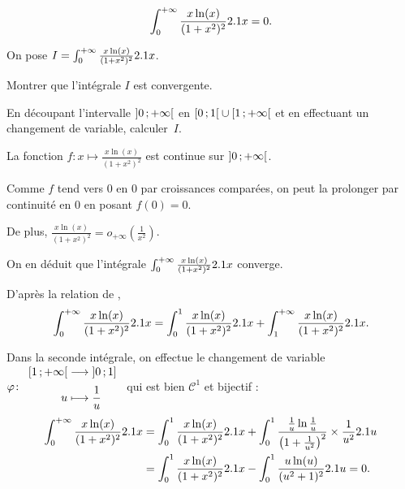 \begin{prop}
\[
\int_0^{+\infty} \frac{x \ln(x)}{(1 + x^2)^2} 2.1 x
= 0.
\]
\end{prop}

\begin{exercice}
On pose $I = \int_0^{+\infty} \frac{x \ln(x)}{(1 + x^2)^2} 2.1 x$.
\begin{questions}
\item Montrer que l'intégrale $I$ est convergente.

\item En découpant l'intervalle $\left]0\,;+\infty\right[$ en $\left[0\,;1\right[ \cup \left[1\,;+\infty\right[$ et en effectuant un changement de variable, calculer~$I$.
\end{questions}
\end{exercice}

\begin{elemsolution}
\begin{reponses}
\item La fonction $f \colon x \mapsto \frac{x \ln(x)}{(1 + x^2)^2}$ est continue sur $\left]0\,;+\infty\right[$.

Comme $f$ tend vers $0$ en $0$ par croissances comparées, on peut la prolonger par continuité en $0$ en posant $f(0) = 0$.

De plus, $\frac{x \ln(x)}{(1+x^2)^2} = o_{+\infty}\mathopen{}\left( \frac{1}{x^2} \right)$.

On en déduit que l'intégrale $\int_0^{+\infty} \frac{x \ln(x)}{(1 + x^2)^2} 2.1 x$ converge.

\item D'après la relation de ,
\[
\int_0^{+\infty} \frac{x \ln(x)}{(1 + x^2)^2} 2.1 x
= \int_0^1 \frac{x \ln(x)}{(1 + x^2)^2} 2.1 x + \int_1^{+\infty} \frac{x \ln(x)}{(1 + x^2)^2} 2.1 x.
\]

Dans la seconde intégrale, on effectue le changement de variable $\fonction[\varphi]{\interfo{1}{+\infty}}{\interof{0}{1}}{u}{\frac{1}{u}}$ qui est bien $\mathscr{C}^1$ et bijectif :
\begin{align*}
\int_0^{+\infty} \frac{x \ln(x)}{(1 + x^2)^2} 2.1 x
&= \int_0^1 \frac{x \ln(x)}{(1 + x^2)^2} 2.1 x + \int_0^1 \frac{\frac{1}{u} \ln \frac{1}{u}}{\big(1 + \frac{1}{u^2}\big)^2} \times \frac{1}{u^2} 2.1 u\\
&= \int_0^1 \frac{x \ln(x)}{(1 + x^2)^2} 2.1 x - \int_0^1 \frac{u \ln(u)}{(u^2 + 1)^2} 2.1 u
= 0.
\end{align*}
\end{reponses}
\end{elemsolution}